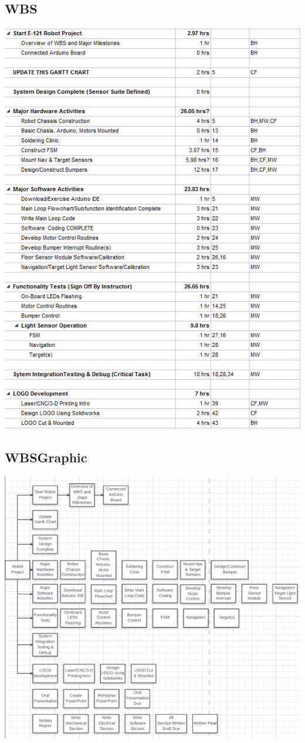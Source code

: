 \documentclass{article}
\begin{document}
\subsection{WBS}
\includegraphics[height=\textheight]{GanttChartBreakdown.png}
\subsection{WBSGraphic}
\includegraphics[width=\textwidth]{WBSGraphic.png}
\end{document}
